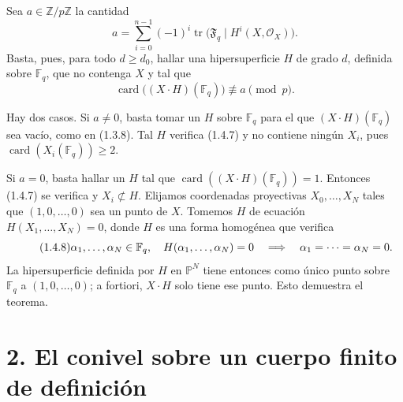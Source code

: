 \pageoriginale

Sea $a\in\mathbb Z/p\mathbb Z$ la cantidad
\[
a=\sum_{i=0}^{n-1}(-1)^i
\operatorname{tr}\bigl(\mathfrak F_q\mid H^i(X,\mathcal O_X)\bigr).
\]
Basta, pues, para todo $d\geq d_0$, hallar una hipersuperficie $H$ de
grado $d$, definida sobre $\mathbb F_q$, que no contenga $X$ y tal que
\begin{equation}\tag{1.4.7}
\operatorname{card}\bigl((X\cdot H)(\mathbb F_q)\bigr)
\not\equiv a\pmod p.
\end{equation}

Hay dos casos. Si $a\ne0$, basta tomar un $H$ sobre $\mathbb F_q$ para el
que $(X\cdot H)(\mathbb F_q)$ sea vacío, como en (1.3.8). Tal $H$ verifica
(1.4.7) y no contiene ningún $X_i$, pues
$\operatorname{card}(X_i(\mathbb F_q))\geq2$.

Si $a=0$, basta hallar un $H$ tal que
$\operatorname{card}((X\cdot H)(\mathbb F_q))=1$. Entonces (1.4.7) se
verifica y $X_i\not\subset H$. Elijamos coordenadas proyectivas
$X_0,\dots,X_N$ tales que $(1,0,\dots,0)$ sea un punto de $X$. Tomemos
$H$ de ecuación $H(X_1,\dots,X_N)=0$, donde $H$ es una forma homogénea
que verifica
\begin{equation}\tag{1.4.8}
\alpha_1,\dots,\alpha_N\in\mathbb F_q,\quad
H(\alpha_1,\sisi{.}{\dots},\alpha_N)=0
\quad\Longrightarrow\quad
\alpha_1=\cdots=\alpha_N=0.
\end{equation}
La hipersuperficie definida por $H$ en $\mathbb P^N$ tiene entonces como
único punto sobre $\mathbb F_q$ a $(1,0,\dots,0)$; a fortiori,
$X\cdot H$ solo tiene ese punto. Esto demuestra el teorema.

\pageoriginale

\section*{2. El conivel sobre un cuerpo finito de definición}

